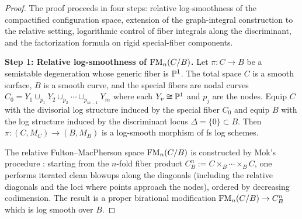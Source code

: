 \begin{proof}
The proof proceeds in four steps: relative log-smoothness of the compactified configuration space, extension of the graph-integral construction to the relative setting, logarithmic control of fiber integrals along the discriminant, and the factorization formula on rigid special-fiber components.

\medskip
\textbf{Step 1: Relative log-smoothness of $\mathrm{FM}_n(C/B)$.}
Let $\pi : C \to B$ be a semistable degeneration whose generic fiber is $\mathbb P^1$. The total space $C$ is a smooth surface, $B$ is a smooth curve, and the special fibers are nodal curves $C_0 = Y_1 \cup_{p_1} Y_2 \cup_{p_2} \cdots \cup_{p_{m-1}} Y_m$ where each $Y_v \cong \mathbb P^1$ and $p_j$ are the nodes. Equip $C$ with the divisorial log structure induced by the special fiber $C_0$ and equip $B$ with the log structure induced by the discriminant locus $\Delta = \{0\} \subset B$. Then $\pi : (C, M_C) \to (B, M_B)$ is a log-smooth morphism of fs log schemes.

The relative Fulton--MacPherson space $\mathrm{FM}_n(C/B)$ is constructed by Mok's procedure \cite{Mok25}: starting from the $n$-fold fiber product $C^n_B := C \times_B \cdots \times_B C$, one performs iterated clean blowups along the diagonals (including the relative diagonals and the loci where points approach the nodes), ordered by decreasing codimension. The result is a proper birational modification $\mathrm{FM}_n(C/B) \to C^n_B$ which is log smooth over $B$.


\end{proof}
